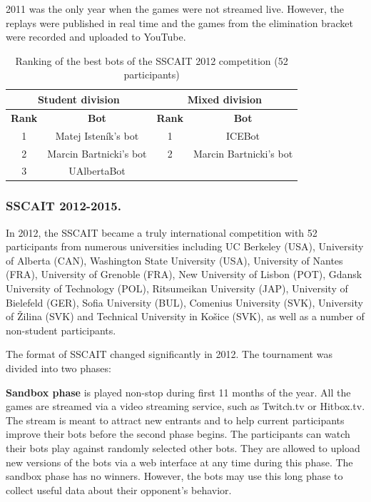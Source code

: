 \documentclass{llncs}
\begin{document}
2011 was the only year when the games were not streamed live. However, the replays were published in real time and the games from the elimination bracket were recorded and uploaded to YouTube.

\begin{table}[!t]
\caption{Ranking of the best bots of the SSCAIT 2012 competition (52 participants)}
\label{tab:sscait2012}
\centering
\begin{tabular}{|c|c|c|c|}
\hline
\multicolumn{2}{|c|}{Student division} & \multicolumn{2}{|c|}{Mixed division}\\ \hline
{\bfseries Rank} & {\bfseries Bot} & {\bfseries Rank} & {\bfseries Bot} \\
\hline
1 & Matej Isten\'{i}k's bot & 1 & ICEBot \\
2 & Marcin Bartnicki's bot  & 2 & Marcin Bartnicki's bot \\
3 & UAlbertaBot 			&   &  \\
\hline
\end{tabular}
\end{table}


\subsubsection*{SSCAIT 2012-2015.}
In 2012, the SSCAIT became a truly international competition with 52 participants from numerous universities including 
UC Berkeley (USA), University of Alberta (CAN), Washington State University (USA), University of Nantes (FRA), University of Grenoble (FRA), New University of Lisbon (POT), Gdansk University of Technology (POL), Ritsumeikan University (JAP), University of Bielefeld (GER), Sofia University (BUL), Comenius University (SVK), University of \v{Z}ilina (SVK) and Technical University in Ko\v{s}ice (SVK), as well as a number of non-student participants. 

The format of SSCAIT changed significantly in 2012. The tournament was divided into two phases:

\textbf{{Sandbox phase}} is played non-stop during first 11 months of the year. All the games are streamed via a video streaming service, such as Twitch.tv or Hitbox.tv. The stream is meant to attract new entrants and to help current participants improve their bots before the second phase begins. The participants can watch their bots play against randomly selected other bots. They are allowed to upload new versions of the bots via a web interface at any time during this phase. The  sandbox phase has no winners. However, the bots may use this long phase to collect useful data about their opponent's behavior. 
\end{document}
